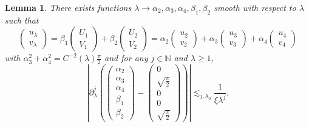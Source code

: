 \documentclass[11 pt]{amsart}
\newtheorem{lem}{Lemma}[section]
\theoremstyle{definition}
\theoremstyle{remark}
\numberwithin{equation}{section}
\begin{document}
\begin{lem}
  \label{kasablanca}There exists functions $\lambda \rightarrow
  \alpha_2, \alpha_3, \alpha_4, \beta_1, \beta_2$ smooth with respect to
  $\lambda$ such that
  \[ \left(\begin{array}{c}
       u_{\lambda}\\
       v_{\lambda}
     \end{array}\right) = \beta_1 \left(\begin{array}{c}
       U_1\\
       V_1
     \end{array}\right) + \beta_2 \left(\begin{array}{c}
       U_2\\
       V_2
     \end{array}\right) = \alpha_2 \left(\begin{array}{c}
       u_2\\
       v_2
     \end{array}\right) + \alpha_3 \left(\begin{array}{c}
       u_3\\
       v_3
     \end{array}\right) + \alpha_4 \left(\begin{array}{c}
       u_4\\
       v_4
     \end{array}\right) \]
with $\alpha_3^2 + \alpha_4^2 =C^{-2}(\lambda)\frac{\pi}{2}$ and for any $j \in \mathbb{N}$ and $\lambda \geqslant 1$,
\begin{equation} \label{estimate-coef-matching-lambda=0}
\left| \partial_{\lambda}^j \left( \left(\begin{array}{c}
       \alpha_2\\
       \alpha_3\\
       \alpha_4\\
       \beta_1\\
       \beta_2
     \end{array}\right) - \left(\begin{array}{c}
      0\\
      \sqrt{\frac{\pi}{2}}\\
       0\\
       0\\
       \sqrt{\frac{\pi}{2}}
     \end{array}\right) \right) \right| \lesssim_{j, \lambda_0}
     \frac{1}{\xi \lambda^{j}} .
\end{equation}

\end{lem}
\end{document}
